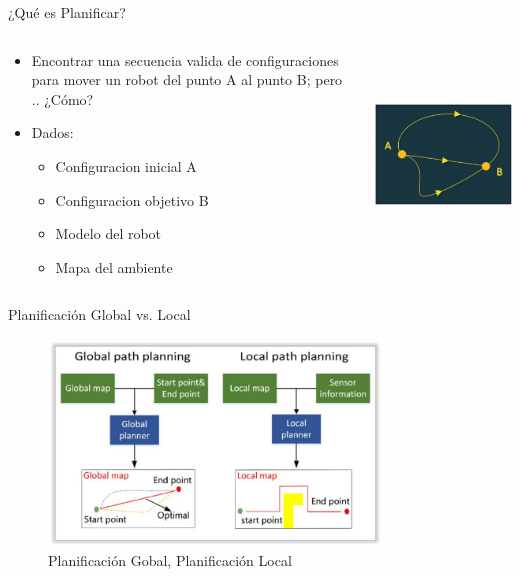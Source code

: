 \documentclass[
	11pt, %
]{beamer}
\begin{document}
\begin{frame}{¿Qu\'{e} es Planificar?}
  \setlength{\leftmargini}{0.5em}
  \begin{columns}[c, onlytextwidth]%
    \begin{column}{.5\textwidth}%
      \setlength{\partopsep}{0pt}%
      \begin{itemize}
        \itemsep 1.5em
      \item <1-> Encontrar una secuencia valida de configuraciones para mover un robot del punto A al punto B; pero .. ¿C\'{o}mo?
      \item <2-> Dados:
        \begin{itemize}
        \item Configuracion inicial A
        \item Configuracion objetivo B
        \item Modelo del robot
        \item Mapa del ambiente
        \end{itemize}
      \end{itemize}
    \end{column}%
    \begin{column}{.45\textwidth}
      \begin{center}
        \includegraphics[width=\textwidth, height=5.5cm]{path}
      \end{center}
    \end{column}%
\end{columns}
\end{frame}

\begin{frame}{Planificaci\'{o}n Global vs. Local}
  \begin{figure}
    \centering
    \includegraphics[width=\textwidth, height=5.5cm]{global_local}
    \caption[Caption for LOF]{Planificación Gobal, Planificación Local\protect\footnotemark}
  \end{figure}
\end{frame}
\end{document}
